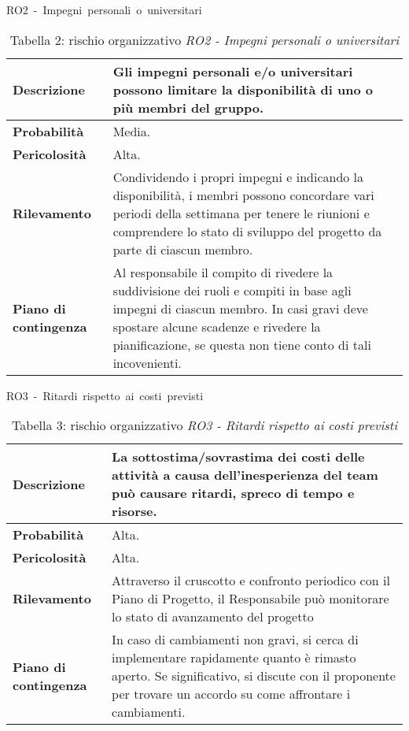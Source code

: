 \documentclass[italian,12pt]{article} %
\begin{document}
\begin{table}[!h]
    \centering
    \hbox{RO2 - Impegni personali o universitari}
    \vspace{0.3cm}
	\begin{tabular}{|l|p{10cm}|} 
		\hline
		\textbf{Descrizione} & Gli impegni personali e/o universitari possono limitare la disponibilità di uno o più membri del gruppo. \\ 
        \hline
        \textbf{Probabilità} & Media. \\
        \hline
        \textbf{Pericolosità} & Alta. \\
        \hline
        \textbf{Rilevamento} & Condividendo i propri impegni e indicando la disponibilità, i membri possono concordare vari periodi della settimana per tenere le riunioni e comprendere lo stato di sviluppo del progetto da parte di ciascun membro. \\
        \hline
        \textbf{Piano di contingenza} & Al responsabile il compito di rivedere la suddivisione dei ruoli e compiti in base agli impegni di ciascun membro. In casi gravi deve spostare alcune scadenze e rivedere la pianificazione, se questa non tiene conto di tali incovenienti. \\
		\hline
	\end{tabular}
    \caption{Tabella 2: rischio organizzativo \textit{RO2 - Impegni personali o universitari}}
\end{table}

\begin{table}[!h]
    \centering
    \hbox{RO3 - Ritardi rispetto ai costi previsti}
    \vspace{0.3cm}
	\begin{tabular}{|l|p{10cm}|} 
		\hline
		\textbf{Descrizione} & La sottostima/sovrastima dei costi delle attività a causa dell'inesperienza del team può causare ritardi, spreco di tempo e risorse.  \\ 
        \hline
        \textbf{Probabilità} & Alta. \\
        \hline
        \textbf{Pericolosità} & Alta. \\
        \hline
        \textbf{Rilevamento} & Attraverso il cruscotto e confronto periodico con il Piano di Progetto, il Responsabile può monitorare lo stato di avanzamento del progetto \\
        \hline
        \textbf{Piano di contingenza} & In caso di cambiamenti non gravi, si cerca di implementare rapidamente quanto è rimasto aperto. Se significativo, si discute con il proponente per trovare un accordo su come affrontare i cambiamenti. \\
		\hline
	\end{tabular}
    \caption{Tabella 3: rischio organizzativo \textit{RO3 - Ritardi rispetto ai costi previsti}}
\end{table}
\end{document}
